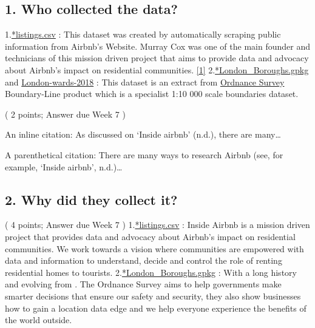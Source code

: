\documentclass[
  a4paper,
  DIV=11,
  numbers=noendperiod]{scrartcl}
\begin{document}
\hypertarget{who-collected-the-data}{%
\subsection{1. Who collected the data?}\label{who-collected-the-data}}

1.\href{http://data.insideairbnb.com/united-kingdom/england/london/2023-09-06/data/listings.csv.gz}{*listings.csv}
: This dataset was created by automatically scraping public information
from Airbnb's Website. Murray Cox was one of the main founder and
technicians of this mission driven project that aims to provide data and
advocacy about Airbnb's impact on residential communities.
\href{(http://insideairbnb.com/about)}{{[}1{]}}
2.\href{https://data.london.gov.uk/download/london_boroughs/9502cdec-5df0-46e3-8aa1-2b5c5233a31f/London_Boroughs.gpkg}{*London\_Boroughs.gpkg}
and
\href{https://data.london.gov.uk/download/statistical-gis-boundary-files-london/08d31995-dd27-423c-a987-57fe8e952990/London-wards-2018.zip}{London-wards-2018}
: This dataset is an extract from
\href{https://www.ordnancesurvey.co.uk/}{Ordnance Survey} Boundary-Line
product which is a specialist 1:10 000 scale boundaries dataset.

( 2 points; Answer due Week 7 )

An inline citation: As discussed on {`Inside airbnb'} (n.d.), there are
many\ldots{}

A parenthetical citation: There are many ways to research Airbnb (see,
for example, {`Inside airbnb'}, n.d.)\ldots{}

\hypertarget{why-did-they-collect-it}{%
\subsection{2. Why did they collect it?}\label{why-did-they-collect-it}}

( 4 points; Answer due Week 7 )
1.\href{http://data.insideairbnb.com/united-kingdom/england/london/2023-09-06/data/listings.csv.gz}{*listings.csv}
: Inside Airbnb is a mission driven project that provides data and
advocacy about Airbnb's impact on residential communities. We work
towards a vision where communities are empowered with data and
information to understand, decide and control the role of renting
residential homes to tourists.
2.\href{https://data.london.gov.uk/download/london_boroughs/9502cdec-5df0-46e3-8aa1-2b5c5233a31f/London_Boroughs.gpkg}{*London\_Boroughs.gpkg}
: With a long history and evolving from . The Ordnance Survey aims to
help governments make smarter decisions that ensure our safety and
security, they also show businesses how to gain a location data edge and
we help everyone experience the benefits of the world outside.
\end{document}
